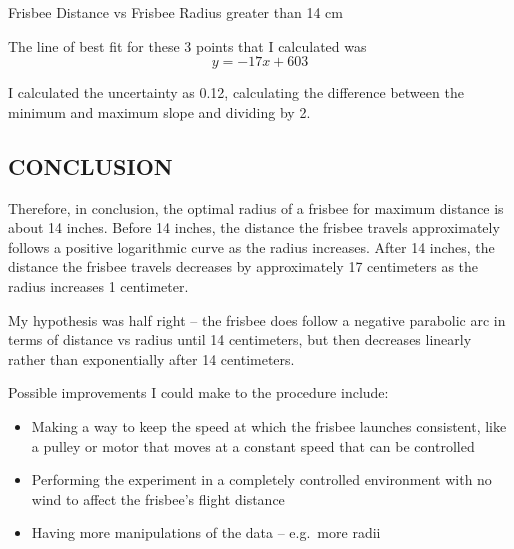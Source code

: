 \documentclass{article}
\begin{document}
Frisbee Distance vs Frisbee Radius greater than 14 cm

The line of best fit for these 3 points that I calculated was \[
y = -17x+603
\]

I calculated the uncertainty as 0.12, calculating the difference between
the minimum and maximum slope and dividing by 2.

\subsection{CONCLUSION}\label{conclusion}

Therefore, in conclusion, the optimal radius of a frisbee for maximum
distance is about 14 inches. Before 14 inches, the distance the frisbee
travels approximately follows a positive logarithmic curve as the radius
increases. After 14 inches, the distance the frisbee travels decreases
by approximately 17 centimeters as the radius increases 1 centimeter.

My hypothesis was half right -- the frisbee does follow a negative
parabolic arc in terms of distance vs radius until 14 centimeters, but
then decreases linearly rather than exponentially after 14 centimeters.

Possible improvements I could make to the procedure include:

\begin{itemize}
\tightlist
\item
  Making a way to keep the speed at which the frisbee launches
  consistent, like a pulley or motor that moves at a constant speed that
  can be controlled
\item
  Performing the experiment in a completely controlled environment with
  no wind to affect the frisbee's flight distance
\item
  Having more manipulations of the data -- e.g.~more radii
\end{itemize}
\end{document}
